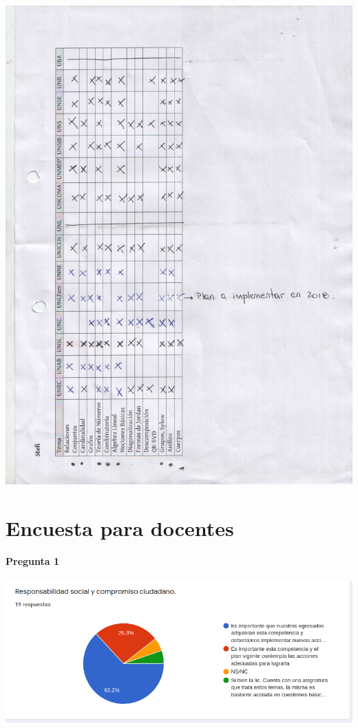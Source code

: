 \documentclass[a4paper,10pt,BCOR10mm,oneside,headsepline]{scrbook}
\begin{document}
\begin{subappendices}
\includegraphics[scale=.3]{01-4.jpg}

\section{Encuesta para docentes}


\paragraph{Pregunta 1}
\begin{center}
 
\includegraphics[scale=.9]{doc01.png}
 \end{center}


\end{subappendices}
\end{document}
